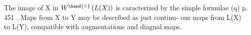 The image of  X  in $W^{\hand{\wedge}}\,(L(X))$  is caracterized by the simple
formulae (q) p. 451 .  Maps from X to Y  may be described as just continu-%
ous  maps from  L(X) to L(Y),  compatible with augmentations and diagnal
maps.


